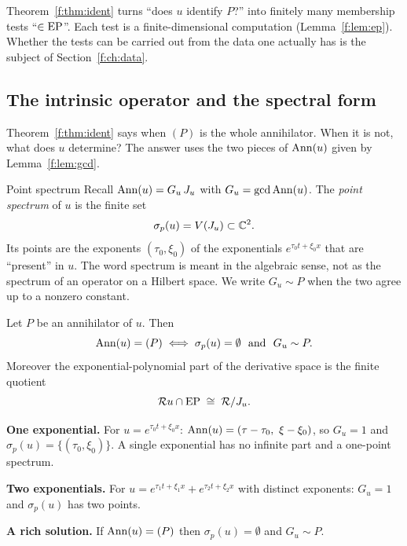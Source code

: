 \begin{takeaway}
Theorem~\ref{f:thm:ident} turns ``does $u$ identify $P$?'' into finitely many membership tests ``$\in\mathrm{EP}$''. Each test is a finite-dimensional computation (Lemma~\ref{f:lem:ep}). Whether the tests can be carried out from the data one actually has is the subject of Section~\ref{f:ch:data}.
\end{takeaway}

\subsection{The intrinsic operator and the spectral form}\label{sec:spectral}

Theorem~\ref{f:thm:ident} says when $(P)$ is the whole annihilator. When it is not, what does $u$ determine? The answer uses the two pieces of $\operatorname{Ann}(u)$ given by Lemma~\ref{f:lem:gcd}.

\begin{notebox}{Point spectrum}
Recall $\operatorname{Ann}(u)=G_u\,J_u$ with $G_u=\operatorname{gcd}\operatorname{Ann}(u)$. The \emph{point spectrum} of $u$ is the finite set
\[
\sigma_p(u)=V(J_u)\subset\mathbb{C}^2 .
\]
Its points are the exponents $(\tau_0,\xi_0)$ of the exponentials $e^{\tau_0t+\xi_0x}$ that are ``present'' in $u$. The word spectrum is meant in the algebraic sense, not as the spectrum of an operator on a Hilbert space. We write $G_u\sim P$ when the two agree up to a nonzero constant.
\end{notebox}

\begin{theorem}\label{thm:spec}
Let $P$ be an annihilator of $u$. Then
\[
\Ann(u)=(P)\iff \sigma_p(u)=\emptyset\ \text{ and }\ G_u\sim P .
\]
Moreover the exponential-polynomial part of the derivative space is the finite quotient
\[
\mathcal{R} u\cap\mathrm{EP}\;\cong\;\mathcal{R}/J_u .
\]
\end{theorem}

\begin{example}
\textbf{One exponential.} For $u=e^{\tau_0t+\xi_0x}$: $\operatorname{Ann}(u)=(\tau-\tau_0,\ \xi-\xi_0)$, so $G_u=1$ and $\sigma_p(u)=\{(\tau_0,\xi_0)\}$. A single exponential has no infinite part and a one-point spectrum.

\textbf{Two exponentials.} For $u=e^{\tau_1t+\xi_1x}+e^{\tau_2t+\xi_2x}$ with distinct exponents: $G_u=1$ and $\sigma_p(u)$ has two points.

\textbf{A rich solution.} If $\operatorname{Ann}(u)=(P)$ then $\sigma_p(u)=\emptyset$ and $G_u\sim P$.
\end{example}

